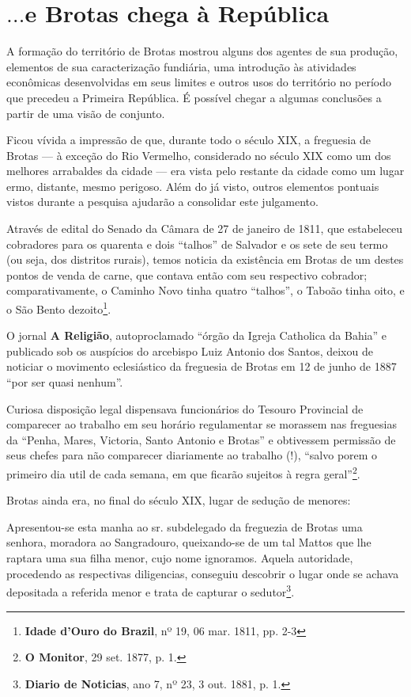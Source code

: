 \section{\(\dots\)e Brotas chega à República}\label{sec:conccap2}

A formação do território de Brotas mostrou alguns dos agentes de sua produção, elementos de sua caracterização fundiária, uma introdução às atividades econômicas desenvolvidas em seus limites e outros usos do território no período que precedeu a Primeira República. É possível chegar a algumas conclusões a partir de uma visão de conjunto.

Ficou vívida a impressão de que, durante todo o século XIX, a freguesia de Brotas --- à exceção do Rio Vermelho, considerado no século XIX como um dos melhores arrabaldes da cidade --- era vista pelo restante da cidade como um lugar ermo, distante, mesmo perigoso. Além do já visto, outros elementos pontuais vistos durante a pesquisa ajudarão a consolidar este julgamento.

Através de edital do Senado da Câmara de 27 de janeiro de 1811, que estabeleceu cobradores para os quarenta e dois ``talhos'' de Salvador e os sete de seu termo (ou seja, dos distritos rurais), temos noticia da existência em Brotas de um destes pontos de venda de carne, que contava então com seu respectivo cobrador; comparativamente, o Caminho Novo tinha quatro ``talhos'', o Taboão tinha oito, e o São Bento dezoito\footnote{\textbf{Idade d'Ouro do Brazil}, nº 19, 06 mar. 1811, pp. 2-3}.

O jornal \textbf{A Religião}, autoproclamado ``órgão da Igreja Catholica da Bahia'' e publicado sob os auspícios do arcebispo Luiz Antonio dos Santos, deixou de noticiar o movimento eclesiástico da freguesia de Brotas em 12 de junho de 1887 ``por ser quasi nenhum''.

Curiosa disposição legal dispensava funcionários do Tesouro Provincial de comparecer ao trabalho em seu horário regulamentar se morassem nas freguesias da ``Penha, Mares, Victoria, Santo Antonio e Brotas'' e obtivessem permissão de seus chefes para não comparecer diariamente ao trabalho (!), ``salvo porem o primeiro dia util de cada semana, em que ficarão sujeitos à regra geral''\footnote{\textbf{O Monitor}, 29 set. 1877, p. 1.}.

Brotas ainda era, no final do século XIX, lugar de sedução de menores:

\begin{citacao}
Apresentou-se esta manha ao sr. subdelegado da freguezia de Brotas uma senhora, moradora ao Sangradouro, queixando-se de um tal Mattos que lhe raptara uma sua filha menor, cujo nome ignoramos. Aquela autoridade, procedendo as respectivas diligencias, conseguiu descobrir o lugar onde se achava depositada a referida menor e trata de capturar o sedutor\footnote{ \textbf{Diario de Noticias}, ano 7, nº 23, 3 out. 1881, p. 1.}.
\end{citacao}


